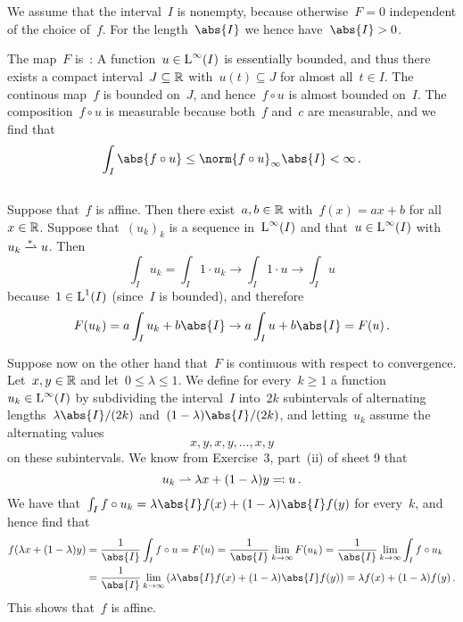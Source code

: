 \section{}

We assume that the interval~$I$ is nonempty, because otherwise~$F = 0$ independent of the choice of~$f$.
For the length~$\abs{I}$ we hence have~$\abs{I} > 0$.

The map~$F$ is~{\welldef}:
A function~$u \in \operatorname{L}^\infty(I)$ is essentially bounded, and thus there exists a compact interval~$J \subseteq \mathbb{R}$ with~$u(t) \subseteq J$ for almost all~$t \in I$.
The continous map~$f$ is bounded on~$J$, and hence~$f \circ u$ is almost bounded on~$I$.
The composition~$f \circ u$ is measurable because both~$f$ and~$c$ are measurable, and we find that
\[
  \int_I \abs{f \circ u}
  \leq
  \norm{f \circ u}_{\infty} \abs{I}
  <
  \infty  \,.
\]





\subsection{}
\label{continuous iff affine}

Suppose that~$f$ is affine.
Then there exist~$a, b \in \mathbb{R}$ with~$f(x) = ax + b$ for all~$x \in \mathbb{R}$.
Suppose that~$(u_k)_k$ is a sequence in~$\operatorname{L}^\infty(I)$ and that~$u \in \operatorname{L}^\infty(I)$ with~$u_k \wtostar u$.
Then
\[
  \int_I u_k
  =
  \int_I 1 \cdot u_k
  \to
  \int_I 1 \cdot u
  \to
  \int_I u
\]
because~$1 \in \operatorname{L}^1(I)$ (since~$I$ is bounded), and therefore
\[
  F(u_k)
  =
  a \int_I u_k + b \abs{I}
  \to
  a \int_I u + b \abs{I}
  =
  F(u) \,.
\]

Suppose now on the other hand that~$F$ is continuous with respect to {\weakstar} convergence.
Let~$x, y \in \mathbb{R}$ and let~$0 \leq \lambda \leq 1$.
We define for every~$k \geq 1$ a function~$u_k \in \operatorname{L}^\infty(I)$ by subdividing the interval~$I$ into~$2k$ subintervals of alternating lengths~$\lambda \abs{I}/(2k)$ and~$(1-\lambda) \abs{I}/(2k)$, and letting~$u_k$ assume the alternating values
\[
  x, y, x, y, \dotsc, x, y
\]
on these subintervals.
We know from Exercise~3, part~(ii) of sheet 9 that
\[
  u_k
  \rightharpoonup
  \lambda x + (1 - \lambda) y
  \eqqcolon
  u \,.
\]
We have that~$\int_I f \circ u_k = \lambda \abs{I} f(x) + (1 - \lambda) \abs{I} f(y)$ for every~$k$, and hence find that 
\begin{align*}
  f( \lambda x + (1-\lambda) y )
  &=
  \frac{1}{\abs{I}} \int_I f \circ u
  =
  F(u)
  =
  \frac{1}{\abs{I}} \lim_{k \to \infty} F(u_k)
  =
  \frac{1}{\abs{I}} \lim_{k \to \infty} \int_I f \circ u_k
  \\
  &=
  \frac{1}{\abs{I}}
  \lim_{k \to \infty}
  \left(
  \lambda \abs{I} f(x) + (1 - \lambda) \abs{I} f(y)
  \right)
  =
  \lambda f(x) + (1 - \lambda) f(y) \,.
\end{align*}
This shows that~$f$ is affine.





